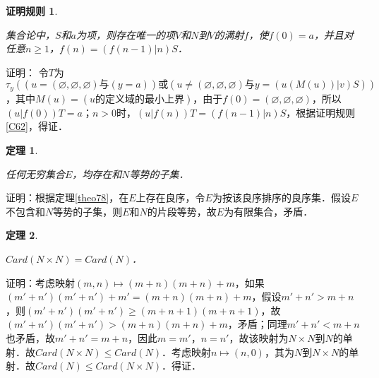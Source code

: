 \documentclass[12pt, a4paper, oneside]{book}
\newtheorem{C}{证明规则}
\newtheorem{theo}{定理}
\begin{document}
			\begin{C}\label{C63}
				\hfill\par
				集合论中，$S$和$a$为项，则存在唯一的项$V$和$N$到$V$的满射$f$，使$f(0)=a$，并且对任意$n\geq 1$，$f(n)=(f(n-1)|n)S$．
			\end{C}
			证明：
			令$T$为$\tau_y((u=(\varnothing, \varnothing, \varnothing)\text{与}(y=a))\text{或}(u\neq (\varnothing, \varnothing, \varnothing)\text{与}y=(u(M(u))|v)S))$，其中$M(u)=(u\text{的定义域的最小上界})$，由于$f(0)=(\varnothing, \varnothing, \varnothing)$，所以$(u|f(0))T=a$；$n>0$时，$(u|f(n))T=(f(n-1)|n)S$，根据证明规则\ref{C62}，得证．
			
			\begin{theo}\label{theo154}
				\hfill\par
				任何无穷集合$E$，均存在和$N$等势的子集．
			\end{theo}
			证明：根据定理\ref{theo78}，在$E$上存在良序，令$E$为按该良序排序的良序集．假设$E$不包含和$N$等势的子集，则$E$和$N$的片段等势，故$E$为有限集合，矛盾．
						
			\begin{theo}\label{theo155}
				\hfill\par
				$Card(N\times N)=Card(N)$．
			\end{theo}
			证明：考虑映射$(m, n)\mapsto (m+n)(m+n)+m$，如果$(m'+n')(m'+n')+m'=(m+n)(m+n)+m$，假设$m'+n'>m+n$，则$(m'+n')(m'+n')\geq (m+n+1)(m+n+1)$，故$(m'+n')(m'+n')>(m+n)(m+n)+m$，矛盾；同理$m'+n'<m+n$也矛盾，故$m'+n'=m+n$，因此$m=m'$，$n=n'$，故该映射为$N\times N$到$N$的单射．故$Card(N\times N)\leq Card(N)$．考虑映射$n\mapsto (n, 0)$，其为$N$到$N\times N$的单射．故$Card(N)\leq Card(N\times N)$．得证．
\end{document}
